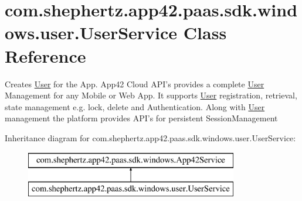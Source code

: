 \hypertarget{classcom_1_1shephertz_1_1app42_1_1paas_1_1sdk_1_1windows_1_1user_1_1_user_service}{\section{com.\+shephertz.\+app42.\+paas.\+sdk.\+windows.\+user.\+User\+Service Class Reference}
\label{classcom_1_1shephertz_1_1app42_1_1paas_1_1sdk_1_1windows_1_1user_1_1_user_service}
}


Creates \hyperlink{classcom_1_1shephertz_1_1app42_1_1paas_1_1sdk_1_1windows_1_1user_1_1_user}{User} for the App. App42 Cloud A\+P\+I's provides a complete \hyperlink{classcom_1_1shephertz_1_1app42_1_1paas_1_1sdk_1_1windows_1_1user_1_1_user}{User} Management for any Mobile or Web App. It supports \hyperlink{classcom_1_1shephertz_1_1app42_1_1paas_1_1sdk_1_1windows_1_1user_1_1_user}{User} registration, retrieval, state management e.\+g. lock, delete and Authentication. Along with \hyperlink{classcom_1_1shephertz_1_1app42_1_1paas_1_1sdk_1_1windows_1_1user_1_1_user}{User} management the platform provides A\+P\+I's for persistent Session\+Management  


Inheritance diagram for com.\+shephertz.\+app42.\+paas.\+sdk.\+windows.\+user.\+User\+Service\+:\begin{figure}[H]
\begin{center}
\leavevmode
\includegraphics[height=2.000000cm]{classcom_1_1shephertz_1_1app42_1_1paas_1_1sdk_1_1windows_1_1user_1_1_user_service}
\end{center}
\end{figure}
